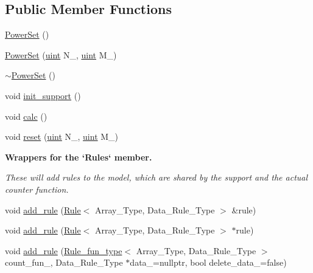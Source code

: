 \subsection*{Public Member Functions}
\begin{DoxyCompactItemize}
\item 
\hyperlink{class_power_set_a095815ccc44c88e0da73d92c6b5cf5f3}{Power\+Set} ()
\item 
\hyperlink{class_power_set_abf6ac4224da7ae4d187d0d63833615b1}{Power\+Set} (\hyperlink{typedefs_8hpp_a91ad9478d81a7aaf2593e8d9c3d06a14}{uint} N\+\_\+, \hyperlink{typedefs_8hpp_a91ad9478d81a7aaf2593e8d9c3d06a14}{uint} M\+\_\+)
\item 
\hyperlink{class_power_set_a89a176c9517e81a066adffad3c46aba5}{$\sim$\+Power\+Set} ()
\item 
void \hyperlink{class_power_set_a8eefc9606c6339938a8d9adcd0d7e153}{init\+\_\+support} ()
\item 
void \hyperlink{class_power_set_ad3b707294498105b2cc1a04017cc96d2}{calc} ()
\item 
void \hyperlink{class_power_set_aba11dd8802cd2eb529c7c30b55994248}{reset} (\hyperlink{typedefs_8hpp_a91ad9478d81a7aaf2593e8d9c3d06a14}{uint} N\+\_\+, \hyperlink{typedefs_8hpp_a91ad9478d81a7aaf2593e8d9c3d06a14}{uint} M\+\_\+)
\end{DoxyCompactItemize}
\begin{Indent}\textbf{ Wrappers for the `\+Rules` member.}\par
{\em These will add rules to the model, which are shared by the support and the actual counter function. }\begin{DoxyCompactItemize}
\item 
void \hyperlink{class_power_set_a00ee318a40da91bcf0bff79bf71454ab}{add\+\_\+rule} (\hyperlink{class_rule}{Rule}$<$ Array\+\_\+\+Type, Data\+\_\+\+Rule\+\_\+\+Type $>$ \&rule)
\item 
void \hyperlink{class_power_set_a6cb8fb8f09b4c190e2ac6c07daa1241e}{add\+\_\+rule} (\hyperlink{class_rule}{Rule}$<$ Array\+\_\+\+Type, Data\+\_\+\+Rule\+\_\+\+Type $>$ $\ast$rule)
\item 
void \hyperlink{class_power_set_aae5eae12186fff037efa3884ac2b3dcc}{add\+\_\+rule} (\hyperlink{typedefs_8hpp_a2e147c9c0e8b65be614c98a5dd400d5c}{Rule\+\_\+fun\+\_\+type}$<$ Array\+\_\+\+Type, Data\+\_\+\+Rule\+\_\+\+Type $>$ count\+\_\+fun\+\_\+, Data\+\_\+\+Rule\+\_\+\+Type $\ast$data\+\_\+=nullptr, bool delete\+\_\+data\+\_\+=false)
\end{DoxyCompactItemize}
\end{Indent}
